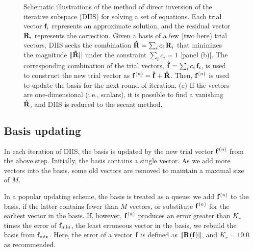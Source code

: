\documentclass[reprint,aip,jcp,superscriptaddress]{revtex4-1}
\begin{document}
\begin{figure}
  \caption{\label{fig:scheme}
    Schematic illustrations of the method of
    direct inversion of the iterative subspace (DIIS)
    for solving a set of equations.
    Each trial vector $\mathbf{f}_i$
    represents an approximate solution,
    and the residual vector $\mathbf{R}_i$
    represents the correction.
    Given a basis of a few (two here) trial vectors,
    DIIS seeks the combination
    $\mathbf{\hat R} = \sum_i c_i \, \mathbf{R}_i$
    that minimizes the magnitude
    $\| \mathbf{\hat R} \|$
    under the constraint
    $\sum_i c_i = 1$ [panel (b)].
    The corresponding combination
    of the trial vectors,
    $\mathbf{\hat f} = \sum_i c_i \, \mathbf{f}_i$,
    is used to construct
    the new trial vector as
    $\mathbf{f}^{(n)} = \mathbf{\hat f} + \mathbf{\hat R}$.
    Then, $\mathbf{f}^{(n)}$ is used to
    update the basis
    for the next round of iteration.
    (c) If the vectors are one-dimensional (i.e., scalars),
    it is possible to find a vanishing $\mathbf{\hat R}$, and
    DIIS is reduced to the secant method.
  }
\end{figure}




\subsection{Basis updating}



In each iteration of DIIS,
the basis is updated
by the new trial vector $\mathbf{f}^{(n)}$
from the above step.
%
Initially,
the basis contains a single vector.
%
As we add more vectors into the basis,
some old vectors are removed
to maintain a maximal size of $M$.



In a popular updating scheme\cite{kovalenko1999},
the basis is treated as a queue:
%
we add $\mathbf{f}^{(n)}$ to the basis,
if the latter contains fewer than $M$ vectors,
%
or substitute $\mathbf{f}^{(n)}$ for the earliest vector in the basis.
%
If, however, $\mathbf{f}^{(n)}$
produces an error greater than
$K_r$ times the error of
$\mathbf{f}_\mathrm{min}$,
the least erroneous vector in the basis,
%
we rebuild the basis
from $\mathbf{f}_\mathrm{min}$.
%
Here, the error of a vector $\mathbf{f}$ is defined as
$\| \mathbf{R}(\mathbf{f}) \|$,
and
$K_r = 10.0$ as recommended\cite{
kovalenko1999}.
\end{document}
